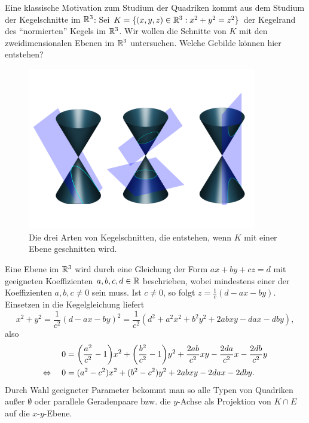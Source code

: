 \begin{beispiel}[Kegelschnitte, $n = 3$]
	\label{bsp:8.10}
	Eine klassische Motivation zum Studium der Quadriken kommt aus dem Studium der Kegelschnitte im $\mathbb{R}^3$:
	Sei $K = \{(x,y,z) \in \mathbb{R}^3 : x^2 + y^2 = z^2 \}$ der Kegelrand des \enquote{normierten} Kegels im $\mathbb{R}^3$.
	Wir wollen die Schnitte von $K$ mit den zweidimensionalen Ebenen im $\mathbb{R}^3$ untersuchen.
	Welche Gebilde können hier entstehen?
	\newpage

	\begin{figure}[h]
		\centering
		\includegraphics[keepaspectratio,width=10cm]{img/conic_sections.pdf}
		\caption{Die drei Arten von Kegelschnitten, die entstehen, wenn $K$ mit einer Ebene geschnitten wird. \cite{conic}}
	\end{figure}

	Eine Ebene im $\mathbb{R}^3$ wird durch eine Gleichung der Form $ax + by + cz = d$ mit geeigneten Koeffizienten $a,b,c,d \in \mathbb{R}$ beschrieben, wobei mindestens einer der Koeffizienten $a,b,c \neq 0$ sein muss.
	Ist $c \neq 0$, so folgt $z = \frac{1}{c} (d-ax-by)$.
	Einsetzen in die Kegelgleichung liefert
	\[
		x^2 + y^2 = \frac{1}{c^2} (d-ax-by)^2 = \frac{1}{c^2}(d^2 + a^2x^2 + b^2y^2 + 2abxy - dax - dby),
	\]
	also
	\begin{align*}
		0 &= \enb{\frac{a^2}{c^2}-1}x^2 + \enb{\frac{b^2}{c^2}-1}y^2 + \frac{2ab}{c^2} xy - \frac{2da}{c^2}x - \frac{2db}{c^2}y \\
		\Leftrightarrow \quad 0 &=(a^2-c^2)x^2 + (b^2-c^2)y^2 + 2abxy - 2dax - 2dby.
	\end{align*}
	Durch Wahl geeigneter Parameter bekommt man so alle Typen von Quadriken außer $\emptyset$ oder parallele Geradenpaare bzw. die $y$-Achse als Projektion von $K \cap E$ auf die $x$-$y$-Ebene.
\end{beispiel}

\newpage
